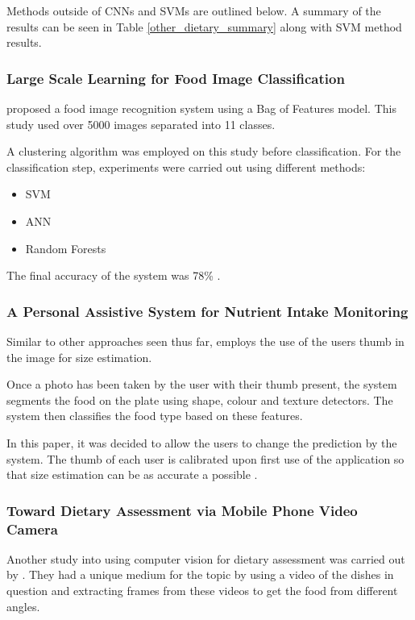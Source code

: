 Methods outside of CNNs and SVMs are outlined below.
A summary of the results can be seen in Table \ref{other_dietary_summary} along with SVM method results.

\subsubsection*{Large Scale Learning for Food Image Classification}
\parencite{LSL_2015} proposed a food image recognition system using a Bag of Features model.
This study used over 5000 images separated into 11 classes.

A clustering algorithm was employed on this study before classification.
For the classification step, experiments were carried out using different methods:
\begin{itemize}
	\item{SVM}
	\item{ANN}
	\item{Random Forests}
\end{itemize}

The final accuracy of the system was 78\% \parencite{LSL_2015}.


\subsubsection*{A Personal Assistive System for Nutrient Intake Monitoring}
Similar to other approaches seen thus far, \parencite{personalAssistive} employs the use of the users thumb in the image for size estimation.

Once a photo has been taken by the user with their thumb present, the system segments the food on the plate using shape, colour and texture detectors.
The system then classifies the food type based on these features.

In this paper, it was decided to allow the users to change the prediction by the system.
The thumb of each user is calibrated upon first use of the application so that size estimation can be as accurate a possible \parencite{personalAssistive}.

\subsubsection*{Toward Dietary Assessment via Mobile Phone Video Camera}
Another study into using computer vision for dietary assessment was carried out by \parencite{chen2010toward}. They had a unique medium for the topic by using a video of the dishes in question and extracting frames from these videos to get the food from different angles.

